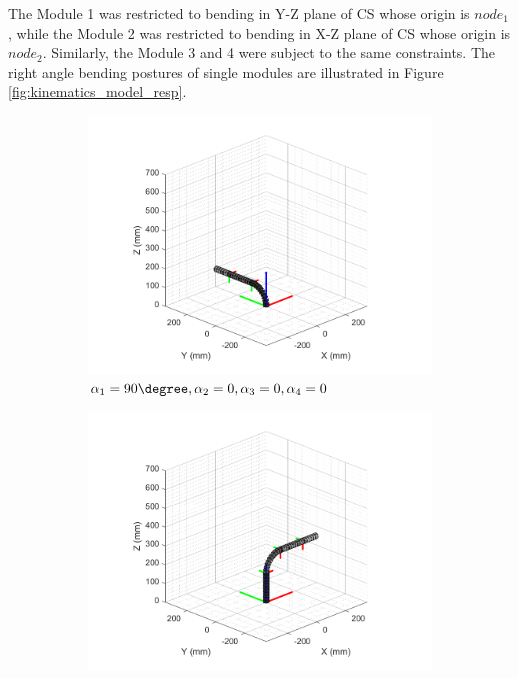 The Module 1 was restricted to bending in Y-Z plane of CS whose origin is $node_1$, while 
the Module 2 was restricted to bending in X-Z plane of CS whose origin is $node_2$. Similarly, the Module 
3 and 4 were subject to the same constraints. The right angle bending postures of single modules are 
illustrated in Figure \ref{fig:kinematics_model_resp}.
\begin{figure}[H] %
    \centering 
    \captionsetup{labelsep=colon}
    \begin{subfigure}{0.48\textwidth} %
        \centering
        \includegraphics[width=\linewidth]{Image/MATLAB/manipulator_90_0_0_0.png}
        \caption{$\alpha_1=90 \degree,\alpha_2=0,\alpha_3=0,\alpha_4=0$}
    \end{subfigure}
    \hfill
    \begin{subfigure}{0.48\textwidth} %
        \centering
        \includegraphics[width=\linewidth]{Image/MATLAB/manipulator_0_90_0_0.png}

\end{subfigure}
\end{figure}
